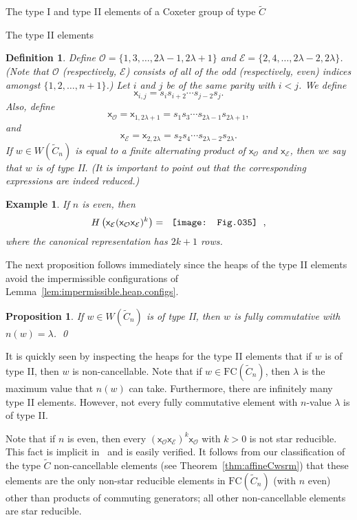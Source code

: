 \documentclass[12pt]{amsart}
\newtheorem{prop}[thm]{Proposition}
\newtheorem{defn}[thm]{Definition}
\newtheorem{ex}[thm]{Example}
\newcommand{\C}{\widetilde{C}}
\renewcommand{\O}{\mathcal{O}}
\newcommand{\E}{\mathcal{E}}
\newcommand{\x}{\mathsf{x}}
\renewcommand{\(}{\left(}
\renewcommand{\)}{\right)}
\newcommand{\FC}{\mathrm{FC}}
\begin{document}
\begin{section}{The type {I} and type II elements of a Coxeter group of type $\C$}
\begin{subsection}{The type II elements}
\begin{defn}
Define $\O=\{1,3, \dots, 2\lambda-1, 2\lambda+1\}$ and $\E=\{2, 4, \dots, 2\lambda-2, 2\lambda\}$.  (Note that $\O$ (respectively, $\E$) consists of all of the odd (respectively, even) indices amongst $\{1, 2, \dots,n+1\}$.)  Let $i$ and $j$ be of the same parity with $i<j$.  We define 
\[
\x_{i,j}=s_{i}s_{i+2}\cdots s_{j-2}s_{j}.
\]
Also, define
\[
\x_{\O}=\x_{1,2\lambda+1}=s_{1}s_{3}\cdots s_{2\lambda-1}s_{2\lambda+1},
\]
and
\[
\x_{\E}=\x_{2,2\lambda}=s_{2}s_{4}\cdots s_{2\lambda-2}s_{2\lambda}.
\]
If $w \in W(\C_n)$ is equal to a finite alternating product of $\x_{\O}$ and $\x_{\E}$, then we say that $w$ is of \emph{type II}.  (It is important to point out that the corresponding expressions are indeed reduced.)
\end{defn}

\begin{ex}
If $n$ is even, then
\[
H\(\x_{\E}(\x_{\O}\x_{\E})^{k}\)=\begin{tabular}[c]{c}
\texttt{[image: Fig.035]}\end{tabular},
\]
where the canonical representation has $2k+1$ rows.
\end{ex}

The next proposition follows immediately since the heaps of the type II elements avoid the impermissible configurations of Lemma~\ref{lem:impermissible.heap.configs}.

\begin{prop}
If $w \in W(\C_{n})$ is of type II, then $w$ is fully commutative with $n(w)=\lambda$.   \qed
\end{prop}

It is quickly seen by inspecting the heaps for the type II elements that if $w$ is of type II, then $w$ is non-cancellable.  Note that if $w \in \FC(\C_{n})$, then $\lambda$ is the maximum value that $n(w)$ can take.  Furthermore, there are infinitely many type II elements.  However, not every fully commutative element with $n$-value $\lambda$ is of type II.

Note that if $n$ is even, then every $\(\x_{\O}\x_{\E}\)^{k}\x_{\O}$ with $k>0$ is not star reducible.  This fact is implicit in~\cite{Green.R:P} and is easily verified.  It follows from our classification of the type $\C$ non-cancellable elements (see Theorem~\ref{thm:affineCwsrm}) that these elements are the only non-star reducible elements in $\FC(\C_{n})$ (with $n$ even) other than products of commuting generators; all other non-cancellable elements are star reducible.

\end{subsection}

\end{section}
\end{document}
